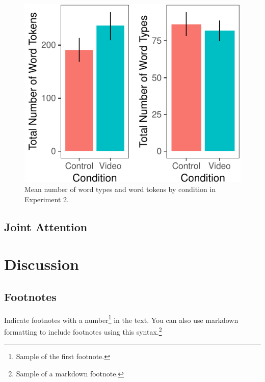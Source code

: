 \documentclass[10pt, letterpaper]{article}
\newenvironment{CodeChunk}{}{}
\begin{document}
\begin{CodeChunk}
\begin{figure}[H]

{\centering \includegraphics{figs/e2token-type-1} 

}

\caption[Mean number of word types and word tokens by condition in Experiment 2]{Mean number of word types and word tokens by condition in Experiment 2.}\label{fig:e2token-type}
\end{figure}
\end{CodeChunk}

\subsection{Joint Attention}\label{joint-attention-1}

\section{Discussion}\label{discussion-1}

\subsection{Footnotes}\label{footnotes}

Indicate footnotes with a number\footnote{Sample of the first
footnote.} in the text. You can also use markdown formatting to include
footnotes using this syntax.\footnote{Sample of a markdown footnote.}
\end{document}
